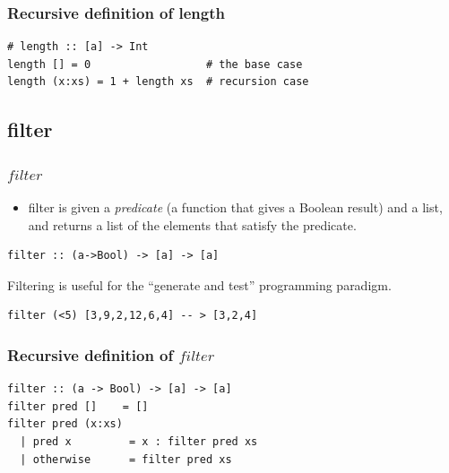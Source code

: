 \documentclass{beamer}
\begin{document}
\begin{frame}[fragile]
\frametitle{Recursive definition of length}

\begin{verbatim}
# length :: [a] -> Int
length [] = 0                  # the base case
length (x:xs) = 1 + length xs  # recursion case
\end{verbatim}

\end{frame}

\subsection{filter}
\begin{frame}[fragile]
\frametitle{$filter$}

\begin{itemize}
\item filter is given a \emph{predicate} (a function that gives a
  Boolean result) and a list, and returns a list of the elements
  that satisfy the predicate.
\end{itemize}

\begin{verbatim}
filter :: (a->Bool) -> [a] -> [a]
\end{verbatim}

Filtering is useful for the ``generate and test'' programming
paradigm.

\begin{verbatim}
filter (<5) [3,9,2,12,6,4] -- > [3,2,4]
\end{verbatim}

\end{frame}

\begin{frame}[fragile]
\frametitle{Recursive definition of $filter$}

\begin{verbatim}
filter :: (a -> Bool) -> [a] -> [a]
filter pred []    = []
filter pred (x:xs)
  | pred x         = x : filter pred xs
  | otherwise      = filter pred xs
\end{verbatim}

\end{frame}

\end{document}
